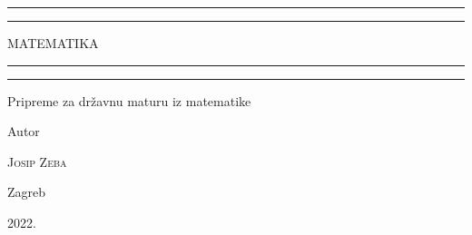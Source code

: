 \documentclass[a4paper,12pt,oneside,draft]{book}
\begin{document}
\begin{titlepage}

	\centering
	\scshape
	\vspace*{\baselineskip}


	\rule{\textwidth}{1.6pt}\vspace*{-\baselineskip}\vspace*{2pt}
	\rule{\textwidth}{0.4pt}

	\vspace{0.75\baselineskip}

	{\LARGE MATEMATIKA\\}

	\vspace{0.75\baselineskip}

	\rule{\textwidth}{0.4pt}\vspace*{-\baselineskip}\vspace{3.2pt}
	\rule{\textwidth}{1.6pt}

	\vspace{2\baselineskip}


	Pripreme za državnu maturu iz matematike

	\vspace*{3\baselineskip}


	Autor

	\vspace{0.5\baselineskip}
	{\scshape\Large Josip Zeba\\}

	\vfill


	\vspace{0.3\baselineskip}
	Zagreb

	2022.

\end{titlepage}

\clearpage
\ifpdf
\fi
{}
\tableofcontents

\clearpage




\end{document}

